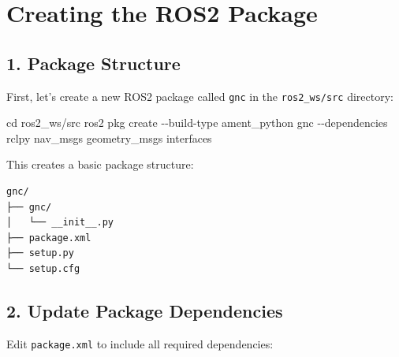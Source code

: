 \documentclass[
  letterpaper,
  DIV=11,
  numbers=noendperiod]{scrreprt}
\newenvironment{Shaded}{\begin{snugshade}}{\end{snugshade}}
\newcommand{\AttributeTok}[1]{\textcolor[rgb]{0.40,0.45,0.13}{#1}}
\newcommand{\BuiltInTok}[1]{\textcolor[rgb]{0.00,0.23,0.31}{#1}}
\newcommand{\ExtensionTok}[1]{\textcolor[rgb]{0.00,0.23,0.31}{#1}}
\newcommand{\NormalTok}[1]{\textcolor[rgb]{0.00,0.23,0.31}{#1}}
\begin{document}
\section*{Creating the ROS2 Package}\label{creating-the-ros2-package}


\subsection*{1. Package Structure}\label{package-structure}

First, let's create a new ROS2 package called \texttt{gnc} in the
\texttt{ros2\_ws/src} directory:

\begin{Shaded}
\begin{Highlighting}[]
\BuiltInTok{cd}\NormalTok{ ros2\_ws/src}
\ExtensionTok{ros2}\NormalTok{ pkg create }\AttributeTok{{-}{-}build{-}type}\NormalTok{ ament\_python gnc }\AttributeTok{{-}{-}dependencies}\NormalTok{ rclpy nav\_msgs geometry\_msgs interfaces}
\end{Highlighting}
\end{Shaded}

This creates a basic package structure:

\begin{verbatim}
gnc/
├── gnc/
│   └── __init__.py
├── package.xml
├── setup.py
└── setup.cfg
\end{verbatim}

\subsection*{2. Update Package
Dependencies}\label{update-package-dependencies}

Edit \texttt{package.xml} to include all required dependencies:
\end{document}
